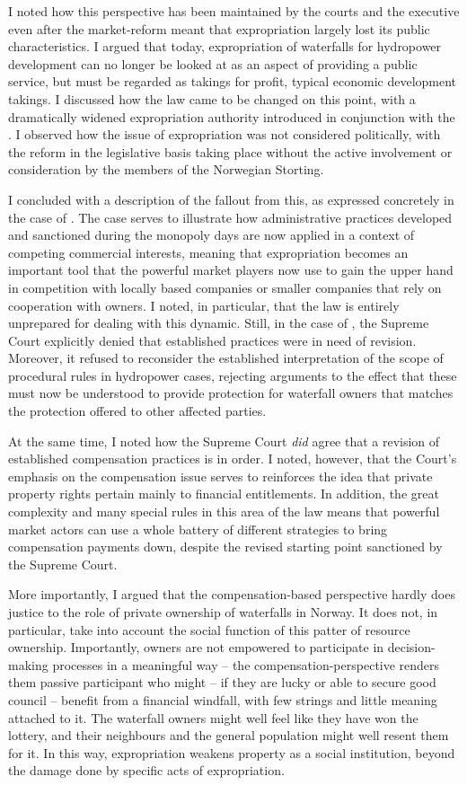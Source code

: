 I noted how this perspective has been maintained by the courts and the executive even after the market-reform meant that expropriation largely lost its public characteristics. I argued that today, expropriation of waterfalls for hydropower development can no longer be looked at as an aspect of providing a public service, but must be regarded as takings for profit, typical economic development takings. I discussed how the law came to be changed on this point, with a dramatically widened expropriation authority introduced in conjunction with the \cite{wra00}. I observed how the issue of expropriation was not considered politically, with the reform in the legislative basis taking place without the active involvement or consideration by the members of the Norwegian Storting.

I concluded with a description of the fallout from this, as expressed concretely in the case of \cite{måland11}. The case serves to illustrate how administrative practices developed and sanctioned during the monopoly days are now applied in a context of competing commercial interests, meaning that expropriation becomes an important tool that the powerful market players now use to gain the upper hand in competition with locally based companies or smaller companies that rely on cooperation with owners. I noted, in particular, that the law is entirely unprepared for dealing with this dynamic. Still, in the case of \cite{måland11}, the Supreme Court explicitly denied that established practices were in need of revision. Moreover, it refused to reconsider the established interpretation of the scope of procedural rules in hydropower cases, rejecting arguments to the effect that these must now be understood to provide protection for waterfall owners that matches the protection offered to other affected parties.

At the same time, I noted how the Supreme Court {\it did} agree that a revision of established compensation practices is in order. I noted, however, that the Court's emphasis on the compensation issue serves to reinforces the idea that private property rights pertain mainly to financial entitlements. In addition, the great complexity and many special rules in this area of the law means that powerful market actors can use a whole battery of different strategies to bring compensation payments down, despite the revised starting point sanctioned by the Supreme Court. 

More importantly, I argued that the compensation-based perspective hardly does justice to the role of private ownership of waterfalls in Norway. It does not, in particular, take into account the social function of this patter of resource ownership. Importantly, owners are not empowered to participate in decision-making processes in a meaningful way -- the compensation-perspective renders them passive participant who might -- if they are lucky or able to secure good council -- benefit from a financial windfall, with few strings and little meaning attached to it. The waterfall owners might well feel like they have won the lottery, and their neighbours and the general population might well resent them for it. In this way, expropriation weakens property as a social institution, beyond the damage done by specific acts of expropriation.

